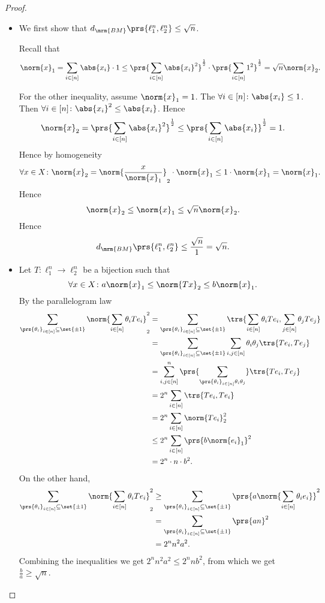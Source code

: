 \documentclass[10pt, twoside]{book}
\begin{document}
\begin{proof}
\begin{itemize}
\item We first show that $d_{\mrm{BM}}\prs{\ell_1^n, \ell_2^n} \leq \sqrt{n}$.

Recall that
\[\norm{x}_1 = \sum_{i \in [n]} \abs{x_i} \cdot 1 \leq \prs{\sum_{i \in [n]} \abs{x_i}^2}^{\frac{1}{2}} \cdot \prs{\sum_{i \in [n]} 1^2}^{\frac{1}{2}} = \sqrt{n} \norm{x}_2 \text{.}\]

For the other inequality, assume $\norm{x}_1 = 1$. The $\forall i \in [n] \colon \abs{x_i} \leq 1$. Then $\forall i \in [n] \colon \abs{x_i}^2 \leq \abs{x_i}$.
Hence
\[\norm{x}_2 = \prs{\sum_{i \in [n]} \abs{x_i}^2}^{\frac{1}{2}} \leq \prs{\sum_{i \in [n]} \abs{x_i}}^{\frac{1}{2}} = 1 \text{.}\]
Hence by homogeneity
\[\forall x \in X \colon \norm{x}_2 = \norm{\frac{x}{\norm{x}_1}}_2 \cdot \norm{x}_1 \leq 1 \cdot \norm{x}_1 = \norm{x}_1 \text{.}\]
Hence
\[\norm{x}_2 \leq \norm{x}_1 \leq \sqrt{n} \norm{x}_2 \text{.}\]
Hence
\[d_{\mrm{BM}}\prs{\ell_1^n, \ell_2^n} \leq \frac{\sqrt{n}}{1} = \sqrt{n} \text{.}\]

\item Let $T \colon \ell_1^n \to \ell_2^n$ be a bijection such that
\[\forall x \in X \colon a \norm{x}_1 \leq \norm{T x}_2 \leq b \norm{x}_1 \text{.}\]
By the parallelogram law
\begin{align*}
\sum_{\prs{\theta_i}_{i \in [n]} \subseteq \set{\pm 1}} \norm{\sum_{i \in [n]} \theta_i T e_i}_2^2
&=
\sum_{\prs{\theta_i}_{i \in [n]} \subseteq \set{\pm 1}} \trs{\sum_{i \in [n]} \theta_i T e_i, \sum_{j \in [n]} \theta_j T e_j}
\\&=
\sum_{\prs{\theta_i}_{i \in [n]} \subseteq \set{\pm 1}} \sum_{i,j \in [n]} \theta_i \theta_j \trs{T e_i, T e_j}
\\&=
\sum_{i,j \in [n]}^n \prs{\sum_{\prs{\theta_i}_{i \in [n]} \theta_i \theta_j}} \trs{T e_i, T e_j}
\\&=
2^n \sum_{i \in [n]} \trs{T e_i, T e_i}
\\&=
2^n \sum_{i \in [n]} \norm{T e_i}_2^2
\\&\leq
2^n \sum_{i \in [n]} \prs{b \norm{e_i}_1}^2
\\&=
2^n \cdot n \cdot b^2 \text{.}
\end{align*}
On the other hand,
\begin{align*}
\sum_{\prs{\theta_i}_{i \in [n]} \subseteq \set{\pm 1}} \norm{\sum_{i \in [n]} \theta_i T e_i}_2^2
&\geq
\sum_{\prs{\theta_i}_{i \in [n]} \subseteq \set{\pm 1}} \prs{a \norm{\sum_{i \in [n]} \theta_i e_i}}^2
\\&=
\sum_{\prs{\theta_i}_{i \in [n]} \subseteq \set{\pm 1}} \prs{a n}^2
\\&=
2^n n^2 a^2 \text{.}
\end{align*}
Combining the inequalities we get $2^n n^2 a^2 \leq 2^n n b^2$, from which we get $\frac{b}{a} \geq \sqrt{n}$.
\end{itemize}
\end{proof}
\end{document}
